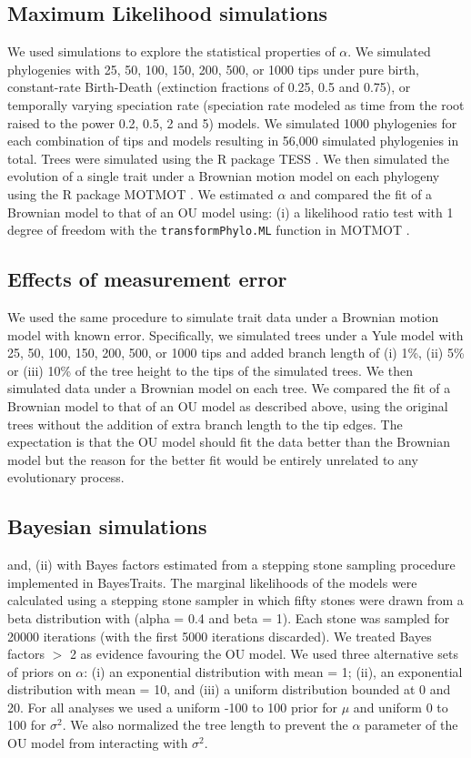 \documentclass[a4paper,12pt]{article}
\begin{document}
  \subsection{Maximum Likelihood simulations}
  \label{section:sims.methods} 
  We used simulations to explore the statistical properties of $\alpha$. 
  We simulated phylogenies with 25, 50, 100, 150, 200, 500, or 1000 tips under pure birth, constant-rate Birth-Death (extinction fractions of 0.25, 0.5 and 0.75), or temporally varying speciation rate (speciation rate modeled as time from the root raised to the power 0.2, 0.5, 2 and 5) models. 
  We simulated 1000 phylogenies for each combination of tips and models resulting in 56,000 simulated phylogenies in total. Trees were simulated using the R package TESS \cite{hohna2013fast}. 
  We then simulated the evolution of a single trait under a Brownian motion model on each phylogeny using the R package MOTMOT \citep{Thomas:2011aa}. 
  We estimated $\alpha$ and compared the fit of a Brownian model to that of an OU model using: (i) a likelihood ratio test with 1 degree of freedom with the \texttt{transformPhylo.ML} function in MOTMOT \citep{Thomas:2011aa}. 

\subsection{Effects of measurement error}
  We used the same procedure to simulate trait data under a Brownian motion model with known error. 
  Specifically, we simulated trees under a Yule model with 25, 50, 100, 150, 200, 500, or 1000 tips and added branch length of (i) 1\%, (ii) 5\% or (iii) 10\% of the tree height to the tips of the simulated trees. We then simulated data under a Brownian model on each tree. 
  We compared the fit of a Brownian model to that of an OU model as described above, using the original trees without the addition of extra branch length to the tip edges. 
  The expectation is that the OU model should fit the data better than the Brownian model but the reason for the better fit would be entirely unrelated to any evolutionary process. 



\subsection{Bayesian simulations}

and, (ii) with Bayes factors estimated from a stepping stone sampling procedure \citep{xie2010improving}implemented in BayesTraits. The marginal likelihoods of the models were calculated using a stepping stone sampler in which fifty stones were drawn from a beta distribution with (alpha = 0.4 and beta = 1). Each stone was sampled for 20000 iterations (with the first 5000 iterations discarded). We treated Bayes factors $>$ 2 as evidence favouring the OU model. We used three alternative sets of priors on $\alpha$: (i) an exponential distribution with mean = 1; (ii), an exponential distribution with mean = 10, and (iii) a uniform distribution bounded at 0 and 20. For all analyses we used a uniform -100 to 100 prior for $\mu$ and uniform 0 to 100 for $\sigma^2$. We also normalized the tree length to prevent the $\alpha$ parameter of the OU model from interacting with $\sigma^2$.
\end{document}
